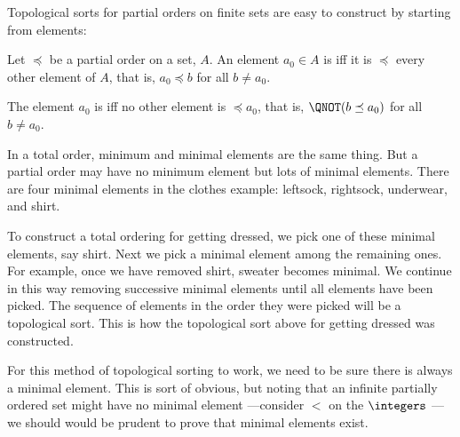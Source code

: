 Topological sorts for partial orders on finite sets are easy to construct
by starting from  elements:

\begin{definition}
Let $\preceq$ be a partial order on a set, $A$.  An element $a_0 \in A$ is
 iff it is $\preceq$ every other element
of $A$, that is, $a_0 \preceq b$ for all $b \neq a_0$.

The element $a_0$ is  iff no other element
is $\preceq a_0$, that is, $\QNOT(b \preceq a_0)$ for all $b \neq a_0$.
\end{definition}

In a total order, minimum and minimal elements are the same thing.  But a
partial order may have no minimum element but lots of minimal elements.
There are four minimal elements in the clothes example: leftsock,
rightsock, underwear, and shirt.

To construct a total ordering for getting dressed, we pick one of these
minimal elements, say shirt.  Next we pick a minimal element among the
remaining ones.  For example, once we have removed shirt, sweater becomes
minimal.  We continue in this way removing successive minimal elements
until all elements have been picked.  The sequence of elements in the
order they were picked will be a topological sort.  This is how the
topological sort above for getting dressed was constructed.

\iffalse %

For this method of topological sorting to work, we need to be sure there
is always a minimal element.  This is sort of obvious, but noting that an
infinite partially ordered set might have no minimal element ---consider
$<$ on the $\integers$ ---we should  would be prudent to prove that minimal
elements exist.

